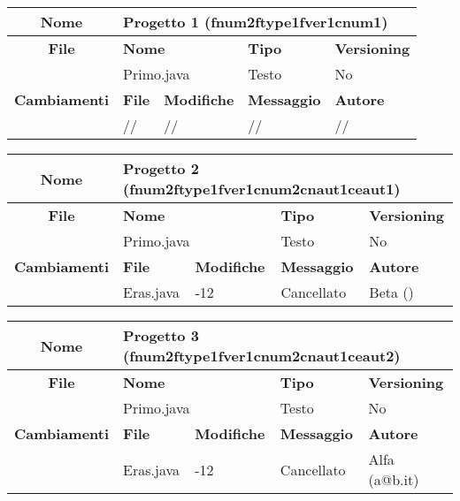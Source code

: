 \begin{table}[ht]
\footnotesize
\begin{tabular}{|c|p{2.5cm}|p{2cm}|p{2.5cm}|p{2.5cm}|}
  \hline
  \textbf{Nome}	& \multicolumn{4}{l|}{Progetto 1 (fnum2ftype1fver1cnum1)} 										\\
  \hline
  \rowcolor{lightgray}\textbf{File} 		& \multicolumn{2}{l|}{\textbf{Nome}}		& \textbf{Tipo}		& \textbf{Versioning} 		\\
						\cline{2-5}
						& \multicolumn{2}{l|}{Primo.java}		& Testo			& No				\\
  \hline
  \rowcolor{lightgray}\textbf{Cambiamenti}	& \textbf{File}		&\textbf{Modifiche}	& \textbf{Messaggio}	& \textbf{Autore}		\\
						\cline{2-5}
						& //			& //	  		& //			& //				\\
						
  \hline
\end{tabular}
\end{table}

\begin{table}[ht]
\footnotesize
\begin{tabular}{|c|p{2.5cm}|p{2cm}|p{2.5cm}|p{2.5cm}|}
  \hline
  \textbf{Nome}	& \multicolumn{4}{l|}{Progetto 2 (fnum2ftype1fver1cnum2cnaut1ceaut1)} 									\\
  \hline
  \rowcolor{lightgray}\textbf{File} 		& \multicolumn{2}{l|}{\textbf{Nome}}		& \textbf{Tipo}		& \textbf{Versioning} 		\\
						\cline{2-5}
						& \multicolumn{2}{l|}{Primo.java}		& Testo			& No				\\
  \hline
  \rowcolor{lightgray}\textbf{Cambiamenti}	& \textbf{File}		&\textbf{Modifiche}	& \textbf{Messaggio}	& \textbf{Autore}		\\
						\cline{2-5}
						& Eras.java		& -12	  		& Cancellato		& Beta ()			\\
						
  \hline
\end{tabular}
\end{table}

\begin{table}[ht]
\footnotesize
\begin{tabular}{|c|p{2.5cm}|p{2cm}|p{2.5cm}|p{2.5cm}|}
  \hline
  \textbf{Nome}	& \multicolumn{4}{l|}{Progetto 3 (fnum2ftype1fver1cnum2cnaut1ceaut2)} 									\\
  \hline
  \rowcolor{lightgray}\textbf{File} 		& \multicolumn{2}{l|}{\textbf{Nome}}		& \textbf{Tipo}		& \textbf{Versioning} 		\\
						\cline{2-5}
						& \multicolumn{2}{l|}{Primo.java}		& Testo			& No				\\
  \hline
  \rowcolor{lightgray}\textbf{Cambiamenti}	& \textbf{File}		&\textbf{Modifiche}	& \textbf{Messaggio}	& \textbf{Autore}		\\
						\cline{2-5}
						& Eras.java		& -12	  		& Cancellato		& Alfa (a@b.it)			\\
						
  \hline
\end{tabular}
\end{table}


